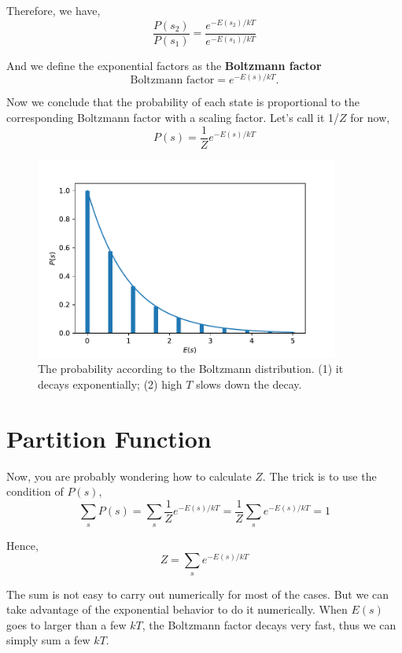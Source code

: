 Therefore, we have,
\begin{equation}
\frac{P(s_2)}{P(s_1)} = \frac{e^{-E(s_2)/kT}}{e^{-E(s_1)/kT}}
\end{equation}

And we define the exponential factors as the {\bf Boltzmann factor}
\begin{equation}
\text{Boltzmann factor} = e^{-E(s)/kT}.
\end{equation}

Now we conclude that the probability of each state is proportional to the corresponding Boltzmann factor with a scaling factor.
Let's call it 1/$Z$ for now,
\begin{equation}
P(s) = \frac{1}{Z}e^{-E(s)/kT}
\end{equation}


\begin{figure}[h]
\centering
\includegraphics[width=10cm]{imgs/Boltzmann}
\caption{The probability according to the Boltzmann distribution. (1) it decays exponentially; (2) high $T$ slows down the decay. }
\end{figure}



\section{Partition Function}
Now, you are probably wondering how to calculate $Z$. The trick is to use the condition of $P(s)$,
\begin{equation}
\sum_s P(s) = \sum_s \frac{1}{Z} e^{-E(s)/kT} = \frac{1}{Z} \sum_s e^{-E(s)/kT} = 1
\end{equation}

Hence, 
\begin{equation}
Z = \sum_s e^{-E(s)/kT}
\end{equation}

The sum is not easy to carry out numerically for most of the cases. But we can take advantage of the exponential behavior to do it numerically.
When $E(s)$ goes to larger than a few $kT$, the Boltzmann factor decays very fast, thus we can simply sum a few $kT$.

